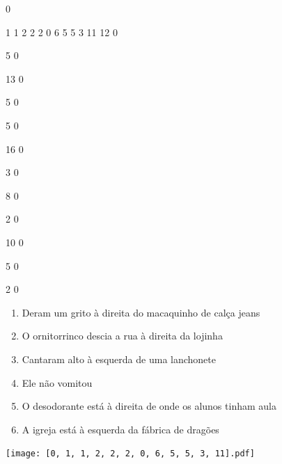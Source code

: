 \documentclass[12pt]{article}
\begin{document}
		\vfill  
		  
{
	0	%

	1	%
	1	%
	2	%
	2	%
	2	%
	0	%
	6	%
	5	%
	5	%
	3	%
	11	%
	12	%
	0	%

	5	%
	0	%

	13	%
	0	%

	5	%
	0	%

	5	%
	0	%

	16	%
	0	%

	3	%
	0	%

	8	%
	0	%

	2	%
	0	%

	10	%
	0	%

	5	%
	0	%

	2	%
	0	%

}	  
		    	

		 

\pagebreak


	\begin{enumerate}
		  \sffamily %
		  \large %


\vfill \item
Deram um grito	%
à direita
do macaquinho de calça jeans	%

\vfill \item
O ornitorrinco descia a rua	%
à direita
da lojinha	%

\vfill \item
Cantaram alto	%
à esquerda
de uma lanchonete	%

\vfill \item
Ele não	%
vomitou	%

\vfill \item
O desodorante está	%
à direita
de onde os alunos tinham aula	%

\vfill \item
A igreja está	%
à esquerda
da fábrica de dragões	%
	\end{enumerate}
		  
		  \hfill

		  \vfill

\texttt{[image: [0, 1, 1, 2, 2, 2, 0, 6, 5, 5, 3, 11].pdf]}
\end{document}
